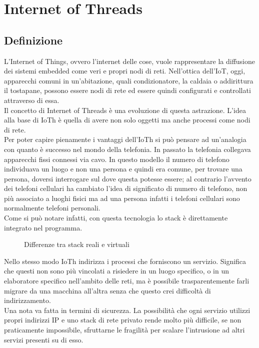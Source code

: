 \chapter{Internet of Threads}                %
\lhead[\fancyplain{}{\bfseries\thepage}]{\fancyplain{}{\bfseries\rightmark}}
\section{Definizione}                 %
L'Internet of Things, ovvero l'internet delle cose, vuole rappresentare la diffusione dei sistemi embedded come veri e propri nodi di reti. Nell'ottica dell'IoT, oggi, apparecchi comuni in un'abitazione, quali condizionatore, la caldaia o addirittura il tostapane, possono essere nodi di rete ed essere quindi configurati e controllati attraverso di essa.\\
Il concetto di Internet of Threads \`e una evoluzione di questa astrazione. L'idea alla base di IoTh \`e quella di avere non solo oggetti ma anche processi come nodi di rete.\\
Per poter capire pienamente i vantaggi dell'IoTh si pu\`o pensare ad un'analogia con quanto \`e successo nel mondo della telefonia. In passato la telefonia collegava apparecchi fissi connessi via cavo. In questo modello il numero di telefono individuava un luogo e non una persona e quindi era comune, per trovare una persona, doversi interrogare sul dove questa potesse essere; al contrario l'avvento dei telefoni cellulari ha cambiato l'idea di significato di numero di telefono, non pi\`u associato a luoghi fisici ma ad una persona infatti i telefoni cellulari sono normalmente telefoni personali\cite{K1,K2}.\\
Come si pu\`o notare infatti, con questa tecnologia lo stack \`e direttamente integrato nel programma.
\begin{figure}[h]
     \begin{center}%
%
    \end{center}
    \caption{%
        Differenze tra stack reali e virtuali
     }%
\end{figure}%
Nello stesso modo IoTh indirizza i processi che forniscono un servizio. Significa che questi non sono pi\`u vincolati a risiedere in un luogo specifico, o in un elaboratore specifico nell'ambito delle reti, ma \`e possibile trasparentemente farli migrare da una macchina all'altra senza che questo crei difficolt\`a di indirizzamento.\\
Una nota va fatta in termini di sicurezza. La possibilit\`a che ogni servizio utilizzi propri indirizzi IP e uno stack di rete privato rende molto pi\`u difficile, se non praticamente impossibile, sfruttarne le fragilit\`a per scalare l'intrusione ad altri servizi presenti su di esso.

